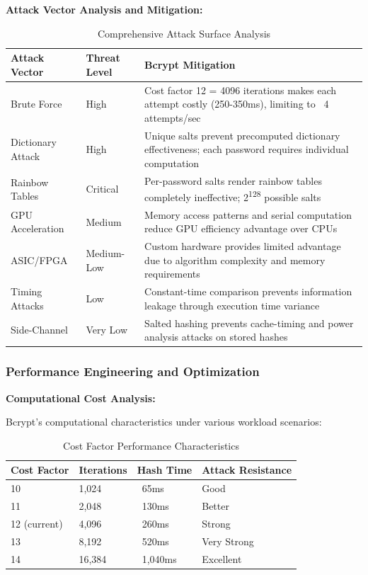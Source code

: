 \documentclass[12pt,a4paper]{article}
\begin{document}
\vspace{0.5em}

\textbf{Attack Vector Analysis and Mitigation:}

\begin{table}[H]
\centering
\small
\begin{tabular}{|p{3.5cm}|p{4cm}|p{5cm}|}
\hline
\textbf{Attack Vector} & \textbf{Threat Level} & \textbf{Bcrypt Mitigation} \\
\hline
Brute Force & High & Cost factor 12 = 4096 iterations makes each attempt costly (250-350ms), limiting to ~4 attempts/sec \\
\hline
Dictionary Attack & High & Unique salts prevent precomputed dictionary effectiveness; each password requires individual computation \\
\hline
Rainbow Tables & Critical & Per-password salts render rainbow tables completely ineffective; 2\textsuperscript{128} possible salts \\
\hline
GPU Acceleration & Medium & Memory access patterns and serial computation reduce GPU efficiency advantage over CPUs \\
\hline
ASIC/FPGA & Medium-Low & Custom hardware provides limited advantage due to algorithm complexity and memory requirements \\
\hline
Timing Attacks & Low & Constant-time comparison prevents information leakage through execution time variance \\
\hline
Side-Channel & Very Low & Salted hashing prevents cache-timing and power analysis attacks on stored hashes \\
\hline
\end{tabular}
\caption{Comprehensive Attack Surface Analysis}
\end{table}

\subsubsection{Performance Engineering and Optimization}

\textbf{Computational Cost Analysis:}

Bcrypt's computational characteristics under various workload scenarios:

\begin{table}[H]
\centering
\begin{tabular}{|p{3cm}|p{3cm}|p{3cm}|p{3cm}|}
\hline
\textbf{Cost Factor} & \textbf{Iterations} & \textbf{Hash Time} & \textbf{Attack Resistance} \\
\hline
10 & 1,024 & ~65ms & Good \\
\hline
11 & 2,048 & ~130ms & Better \\
\hline
12 (current) & 4,096 & ~260ms & Strong \\
\hline
13 & 8,192 & ~520ms & Very Strong \\
\hline
14 & 16,384 & ~1,040ms & Excellent \\
\hline
\end{tabular}
\caption{Cost Factor Performance Characteristics}
\end{table}
\end{document}
